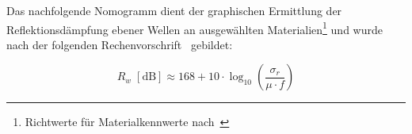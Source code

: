 
Das nachfolgende Nomogramm dient der graphischen Ermittlung der Reflektionsdämpfung ebener Wellen an ausgewählten Materialien\footnote{Richtwerte für Materialkennwerte nach~\cite{Simplified_shielding}} und wurde nach der folgenden Rechenvorschrift~\cite{Simplified_shielding} gebildet:

\begin{equation}
    R_w \; \left[\text{dB}\right] \approx 168 + 10 \cdot \log_{10}\left(\frac{\sigma_r}{\mu \cdot f}\right)
\end{equation}